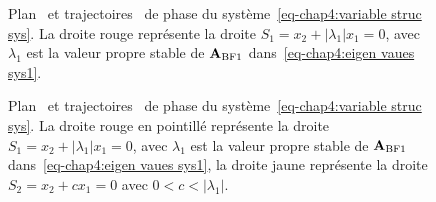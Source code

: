 \begin{figure}
	\centering
	\caption{Plan~ et trajectoires~ de phase du système~\eqref{eq-chap4:variable struc sys}. La droite  rouge représente la droite $S_1=x_2 + |\lambda_1|x_1=0$, avec $\lambda_1$ est la valeur propre stable de $\mathbf{A}_{\rm BF 1}$ dans~\eqref{eq-chap4:eigen vaues sys1}.}
	\label{fig:VSS1}
\end{figure}
\begin{figure}
	\centering
	\caption{Plan~ et trajectoires~ de phase du système~\eqref{eq-chap4:variable struc sys}. La droite rouge en pointillé représente la droite $S_1=x_2 + |\lambda_1|x_1=0$, avec $\lambda_1$ est la valeur propre stable de $\mathbf{A}_{\rm BF 1}$ dans~\eqref{eq-chap4:eigen vaues sys1}, la droite  jaune représente la droite $S_2=x_2 + cx_1=0$ avec $0<c<|\lambda_1|$.}
	\label{fig:VSS2}
\end{figure}
